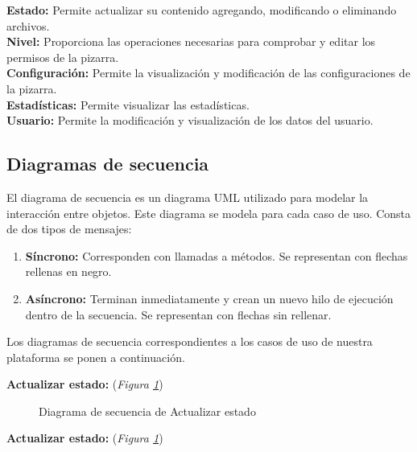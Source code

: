 \textbf{Estado:} Permite actualizar su contenido agregando, modificando o eliminando archivos.\\

\textbf{Nivel: }Proporciona las operaciones necesarias para comprobar y editar los permisos de la pizarra.\\

\textbf{Configuración: }Permite la visualización y modificación de las configuraciones de la pizarra.\\

\textbf{Estadísticas: }Permite visualizar las estadísticas.\\

\textbf{Usuario:} Permite la modificación y visualización de los datos del usuario.

\begin{sidewaysfigure}
\centering
\clases
\caption{Diagrama de clases}
\label{diagramadeclases2}
\end{sidewaysfigure}
\newpage

\subsection{Diagramas de secuencia}

El diagrama de secuencia es un diagrama UML utilizado para modelar la interacción entre objetos. Este diagrama se modela para cada caso de uso. Consta de dos tipos de mensajes:
\begin{enumerate}
	\item \textbf{Síncrono: }Corresponden con llamadas a métodos. Se representan con flechas rellenas en negro.
	\item \textbf{Asíncrono: }Terminan inmediatamente y crean un nuevo hilo de ejecución dentro de la secuencia. Se representan con flechas sin rellenar.
\end{enumerate}

Los diagramas de secuencia correspondientes a los casos de uso de nuestra plataforma se ponen a continuación.

\textbf{Actualizar estado:} (\emph{Figura \ref{fig:seqActualizarEstado}}) 

\begin{figure}[H]
\centering
\configurarPizarra
\caption{Diagrama de secuencia de Actualizar estado}
\label{fig:seqActualizarEstado}
\end{figure}


\textbf{Actualizar estado:} (\emph{Figura \ref{fig:seqActualizarEstado}}) 

